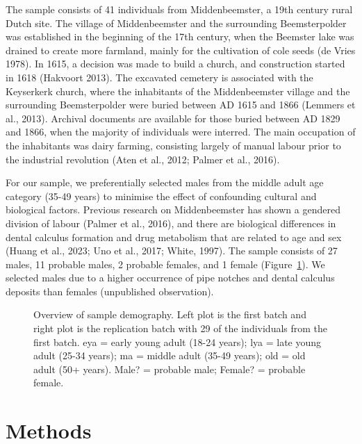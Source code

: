 \documentclass[
]{article}
\begin{document}
The sample consists of 41 individuals from Middenbeemster, a 19th
century rural Dutch site. The village of Middenbeemster and the
surrounding Beemsterpolder was established in the beginning of the 17th
century, when the Beemster lake was drained to create more farmland,
mainly for the cultivation of cole seeds (de Vries 1978). In 1615, a
decision was made to build a church, and construction started in 1618
(Hakvoort 2013). The excavated cemetery is associated with the
Keyserkerk church, where the inhabitants of the Middenbeemster village
and the surrounding Beemsterpolder were buried between AD 1615 and 1866
(Lemmers et al., 2013). Archival documents are available for those
buried between AD 1829 and 1866, when the majority of individuals were
interred. The main occupation of the inhabitants was dairy farming,
consisting largely of manual labour prior to the industrial revolution
(Aten et al., 2012; Palmer et al., 2016).

For our sample, we preferentially selected males from the middle adult
age category (35-49 years) to minimise the effect of confounding
cultural and biological factors. Previous research on Middenbeemster has
shown a gendered division of labour (Palmer et al., 2016), and there are
biological differences in dental calculus formation and drug metabolism
that are related to age and sex (Huang et al., 2023; Uno et al., 2017;
White, 1997). The sample consists of 27 males, 11 probable males, 2
probable females, and 1 female (Figure~\ref{fig-sample-demography}). We
selected males due to a higher occurrence of pipe notches and dental
calculus deposits than females (unpublished observation).

\begin{figure}


\caption{\label{fig-sample-demography}Overview of sample demography.
Left plot is the first batch and right plot is the replication batch
with 29 of the individuals from the first batch. eya = early young adult
(18-24 years); lya = late young adult (25-34 years); ma = middle adult
(35-49 years); old = old adult (50+ years). Male? = probable male;
Female? = probable female.}

\end{figure}%

\section{Methods}\label{methods}
\end{document}
